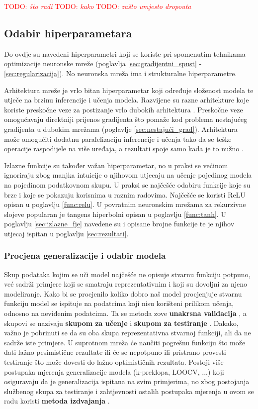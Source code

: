 \documentclass[times, utf8, numeric, diplomski]{fer}
\def\secref#1{(poglavlje \ref{#1})}
\def\TODO#1{\noindent\textcolor{red}{TODO: \textit{#1}}\newline}
\def\todo#1{\TODO{#1}}
\begin{document}
\todo{što radi}
\todo{kako}
\todo{zašto umjesto dropouta}

\subsection{Odabir hiperparametara}
Do ovdje su navedeni hiperparametri koji se koriste pri spomenutim tehnikama optimizacije neuronske mreže (poglavlja \ref{sec:gradijentni_spust} - \ref{sec:regularizacija}). No neuronska mreža ima i strukturalne hiperparametre.

Arhitektura mreže je vrlo bitan hiperparametar koji određuje složenost modela te utječe na brzinu inferencije i učenja modela. Razvijene su razne arhitekture koje koriste preskočne veze za postizanje vrlo dubokih arhitektura \citep{resnet, densenet}. Preskočne veze omogućavaju direktniji prijenos gradijenta što pomaže kod problema nestajućeg gradijenta u dubokim mrežama \secref{sec:nestajući_grad}. Arhitektura može omogućiti dodatnu paralelizaciju inferencije i učenja tako da se teške operacije raspodijele na više uređaja, a rezultati spoje samo kada je to nužno \citep{alexnet}.

Izlazne funkcije su također važan hiperparametar, no u praksi se većinom ignoriraju zbog manjka intuicije o njihovom utjecaju na učenje pojedinog modela na pojedinom podatkovnom skupu. U praksi se najčešće odabiru funkcije koje su brze i koje se pokazuju korisnima u raznim radovima. Najčešće se koristi ReLU opisan u poglavlju \ref{func:relu}. U povratnim neuronskim mrežama za rekurzivne slojeve popularan je tangens hiperbolni opisan u poglavlju \ref{func:tanh}. U poglavlju \ref{sec:izlazne_fje} navedene su i opisane brojne funkcije te je njihov utjecaj ispitan u poglavlju \ref{sec:rezultati}.

\subsubsection{Procjena generalizacije i odabir modela}
\label{sec:crossval}
Skup podataka kojim se uči model najčešće ne opisuje stvarnu funkciju potpuno, već sadrži primjere koji se smatraju reprezentativnim i koji su dovoljni za njeno modeliranje. Kako bi se procjenilo koliko dobro naš model procjenjuje stvarnu funkciju model se ispituje na podatcima koji nisu korišteni prilikom učenja, odnosno na neviđenim podatcima. Ta se metoda zove \textbf{unakrsna validacija} , a skupovi se nazivaju \textbf{skupom za učenje}  i \textbf{skupom za testiranje} . Dakako, važno je pobrinuti se da su oba skupa reprezentativna stvarnoj funkciji, ali da ne sadrže iste primjere. U suprotnom mreža će naučiti pogrešnu funkciju što može dati lažno pesimistične rezultate ili će se nepotpuno ili pristrano provesti testiranje što može dovesti do lažno optimističnih rezultata. Postoji više postupaka mjerenja generalizacije modela (k-preklopa, LOOCV, ...) koji osiguravaju da je generalizacija ispitana na svim primjerima, no zbog postojanja službenog skupa za testiranje i zahtjevnosti ostalih postupaka mjerenja u ovom se radu koristi \textbf{metoda izdvajanja} .
\end{document}
